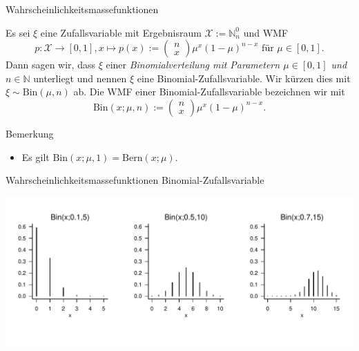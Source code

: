 \documentclass[
  8pt,
  ignorenonframetext,
]{beamer}
\begin{document}
\begin{frame}{Wahrscheinlichkeitsmassefunktionen}
\protect\hypertarget{wahrscheinlichkeitsmassefunktionen-3}{}
\small
\begin{definition}
\vspace{2pt}
\justifying

Es sei $\xi$ eine Zufallsvariable mit Ergebnisraum $\mathcal{X} := \mathbb{N}_n^0$
und WMF
\begin{equation}
p : \mathcal{X} \to [0,1],
x\mapsto p(x) :=
\begin{pmatrix}
n \\ x
\end{pmatrix}
\mu^{x}(1 - \mu)^{n-x} \mbox{ für } \mu \in [0,1].
\end{equation}
Dann sagen wir, dass $\xi$ einer \textit{Binomialverteilung mit Parametern $\mu \in [0,1]$
und $n \in \mathbb{N}$} unterliegt und nennen $\xi$ eine Binomial-Zufallsvariable.
Wir kürzen dies mit $\xi \sim \mbox{Bin}(\mu,n)$ ab. Die WMF einer
Binomial-Zufallsvariable bezeichnen wir mit
\begin{equation}
\mbox{Bin}(x;\mu,n) :=
\begin{pmatrix}
n \\ x
\end{pmatrix}
\mu^{x}(1 - \mu)^{n-x}.
\end{equation}
\end{definition}

Bemerkung

\begin{itemize}
\item Es gilt $\mbox{Bin}(x;\mu,1) = \mbox{Bern}(x;\mu)$.
\end{itemize}
\end{frame}

\begin{frame}{Wahrscheinlichkeitsmassefunktionen}
\protect\hypertarget{wahrscheinlichkeitsmassefunktionen-4}{}
Binomial-Zufallsvariable \vspace{1cm}

\begin{center}\includegraphics[width=1\linewidth]{4_Abbildungen/wtfi_4_binomialverteilung_wmf} \end{center}
\end{frame}
\end{document}
